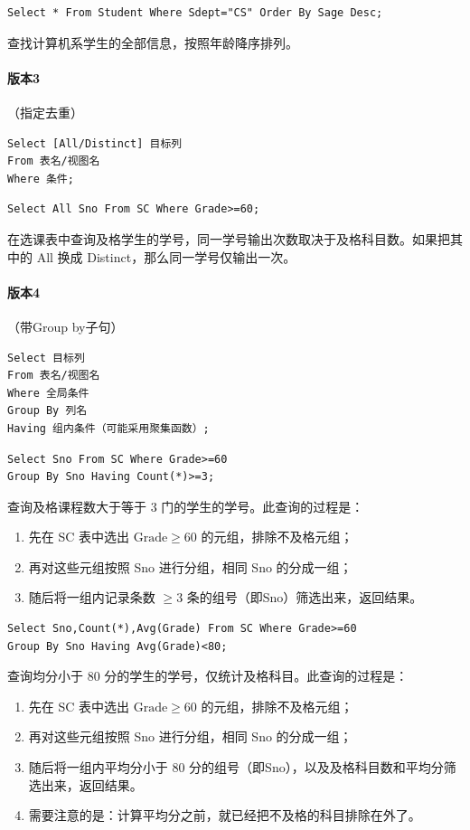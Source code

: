 \documentclass[UTF8]{ctexart}
\begin{document}
\begin{lstlisting}[backgroundcolor=\color{white}]
Select * From Student Where Sdept="CS" Order By Sage Desc;
\end{lstlisting}
查找计算机系学生的全部信息，按照年龄降序排列。

\paragraph{版本3}（指定去重）
\begin{lstlisting}
Select [All/Distinct] 目标列
From 表名/视图名
Where 条件;
\end{lstlisting}

\begin{lstlisting}[backgroundcolor=\color{white}]
Select All Sno From SC Where Grade>=60;
\end{lstlisting}
在选课表中查询及格学生的学号，同一学号输出次数取决于及格科目数。如果把其中的 All 换成 Distinct，那么同一学号仅输出一次。

\paragraph{版本4}（带Group by子句）
\begin{lstlisting}
Select 目标列
From 表名/视图名
Where 全局条件
Group By 列名
Having 组内条件（可能采用聚集函数）;
\end{lstlisting}

\begin{lstlisting}[backgroundcolor=\color{white}]
Select Sno From SC Where Grade>=60
Group By Sno Having Count(*)>=3;
\end{lstlisting}
查询及格课程数大于等于 3 门的学生的学号。此查询的过程是：
\begin{enumerate}
    \item 先在 SC 表中选出 $\mathrm{Grade\geqslant 60}$ 的元组，排除不及格元组；
    \item 再对这些元组按照 Sno 进行分组，相同 Sno 的分成一组；
    \item 随后将一组内记录条数 $\geqslant 3$ 条的组号（即Sno）筛选出来，返回结果。
\end{enumerate}


\begin{lstlisting}[backgroundcolor=\color{white}]
Select Sno,Count(*),Avg(Grade) From SC Where Grade>=60
Group By Sno Having Avg(Grade)<80;
\end{lstlisting}
查询均分小于 80 分的学生的学号，仅统计及格科目。此查询的过程是：
\begin{enumerate}
    \item 先在 SC 表中选出 $\mathrm{Grade\geqslant 60}$ 的元组，排除不及格元组；
    \item 再对这些元组按照 Sno 进行分组，相同 Sno 的分成一组；
    \item 随后将一组内平均分小于 80 分的组号（即Sno），以及及格科目数和平均分筛选出来，返回结果。
    \item 需要注意的是：计算平均分之前，就已经把不及格的科目排除在外了。
\end{enumerate}
\end{document}
